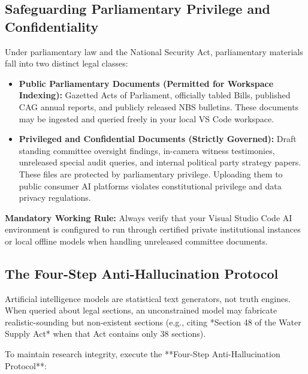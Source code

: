 \documentclass[11pt, a4paper]{report}
\begin{document}
\subsection{Safeguarding Parliamentary Privilege and Confidentiality}
Under parliamentary law and the National Security Act, parliamentary materials fall into two distinct legal classes:
\begin{itemize}[label=-]
    \item \textbf{Public Parliamentary Documents (Permitted for Workspace Indexing):} Gazetted Acts of Parliament, officially tabled Bills, published CAG annual reports, and publicly released NBS bulletins. These documents may be ingested and queried freely in your local VS Code workspace.
    \item \textbf{Privileged and Confidential Documents (Strictly Governed):} Draft standing committee oversight findings, in-camera witness testimonies, unreleased special audit queries, and internal political party strategy papers. These files are protected by parliamentary privilege. Uploading them to public consumer AI platforms violates constitutional privilege and data privacy regulations.
\end{itemize}

\textbf{Mandatory Working Rule:} Always verify that your Visual Studio Code AI environment is configured to run through certified private institutional instances or local offline models when handling unreleased committee documents.

\subsection{The Four-Step Anti-Hallucination Protocol}
Artificial intelligence models are statistical text generators, not truth engines. When queried about legal sections, an unconstrained model may fabricate realistic-sounding but non-existent sections (e.g., citing *Section 48 of the Water Supply Act* when that Act contains only 38 sections).

To maintain research integrity, execute the **Four-Step Anti-Hallucination Protocol**:
\end{document}

